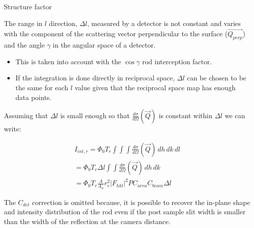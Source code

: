 \begin{frame}{Structure factor}

    The range in $l$ direction, $\Delta l$, measured by a detector is not constant and varies with the component of the scattering vector perpendicular to the surface ($\vec{Q_{perp}}$) and the angle $\gamma$ in the angular space of a detector.

    \begin{itemize}
        \item This is taken into account with the $\cos \gamma$ rod interception factor.
        \item If the integration is done directly in reciprocal space, $\Delta l$ can be chosen to be the same for each $l$ value given that the reciprocal space map has enough data points.
    \end{itemize}
    
    Assuming that $\Delta l$ is small enough so that $\frac{d\sigma}{d\Omega}(\vec{Q})$ is constant within $\Delta l$ we can write:

    \begin{align}
        I_{int,r} = \Phi_0 T_r \int \int \int \frac{d\sigma}{d\Omega}(\vec{Q})\, dh \, dk \, dl \\
        = \Phi_0 T_r \Delta l \int \int \frac{d\sigma}{d\Omega}(\vec{Q})\, dh \, dk \\
        = \Phi_0 T_r \frac{A}{A_u} r_e^2 |F_{hkl}|^2 P C_{area} C_{beam} \Delta l 
    \end{align}


    The $C_{det}$ correction is omitted because, it is possible to recover the in-plane shape and intensity distribution of the rod even if the post sample slit width is smaller than the width of the reflection at the camera distance.
        
\end{frame}


